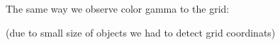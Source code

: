 The same way we observe color gamma to the grid:

(due to small size of objects we had to detect grid coordinats)

\begin{figure}[h]
\centering
\end{figure}